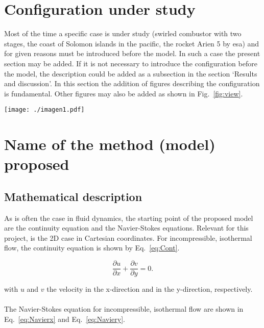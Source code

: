 \documentclass[fleqn,12pt]{NTFD} %
\begin{document}
\lipsum[1-3] %


\section{Configuration under study}


Most of the time a specific case is under study (swirled combustor with two stages, the coast of Solomon islands in the pacific, the rocket Arien 5 by esa) and for given reasons must  be introduced before the model. In such a case the present section may be added. If it is not necessary to introduce the configuration before the model, the description could be added as a subsection in the section `Results and discussion'. In this section  the addition of figures describing the configuration is fundamental. Other figures may also be added as shown in Fig.~\ref{fig:view}. 

\begin{figure*}[ht]\centering %
\texttt{[image: ./imagen1.pdf]}
\caption{Wide Picture}
\label{fig:view}
\end{figure*}



\section{Name of the method (model) proposed}


\subsection{Mathematical description}
As is often the case in fluid dynamics, the starting point of the proposed model are the continuity equation and the Navier-Stokes equations. Relevant for this project, is the 2D case in Cartesian coordinates. For incompressible, isothermal flow, the continuity equation is shown by Eq.~\eqref{eq:Cont}.

\begin{equation}
\frac{\partial u}{\partial x} + \frac{\partial v}{\partial y} = 0.
\label{eq:Cont}
\end{equation}

with $u$ and $v$ the velocity in the x-direction and in the y-direction, respectively.
\\
\\
The Navier-Stokes equation for incompressible, isothermal flow are shown in Eq.~\eqref{eq:Navierx} and Eq.~\eqref{eq:Naviery}. 
\end{document}
